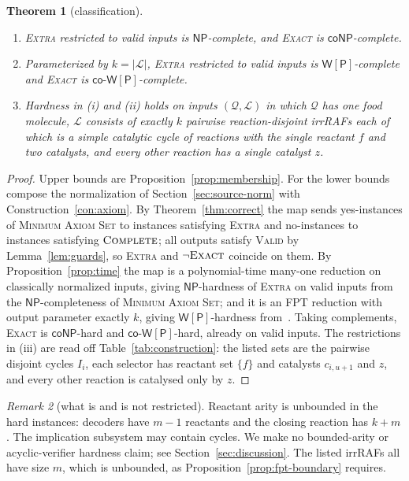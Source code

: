 \documentclass[11pt,a4paper]{article}
\theoremstyle{plain}
\newtheorem{theorem}{Theorem}[section]
\theoremstyle{definition}
\theoremstyle{remark}
\newtheorem{remark}[theorem]{Remark}
\newcommand{\Valid}{\textup{\textsc{Valid}}}
\newcommand{\Complete}{\textup{\textsc{Complete}}}
\newcommand{\Exact}{\textup{\textsc{Exact}}}
\newcommand{\Extra}{\textup{\textsc{Extra}}}
\newcommand{\MAS}{\textup{\textsc{Minimum Axiom Set}}}
\newcommand{\NP}{\mathsf{NP}}
\newcommand{\coNP}{\mathsf{coNP}}
\newcommand{\WP}{\mathsf{W[P]}}
\newcommand{\coWP}{\mathsf{co\text{-}W[P]}}
\newcommand{\cL}{\mathcal{L}}
\newcommand{\cQ}{\mathcal{Q}}
\begin{document}
\begin{theorem}[classification]\label{thm:main}
\leavevmode
\begin{enumerate}[label=\textup{(\roman*)}]
\item \Extra{} restricted to valid inputs is $\NP$-complete, and \Exact{} is $\coNP$-complete.
\item Parameterized by $k=|\cL|$, \Extra{} restricted to valid inputs is $\WP$-complete and \Exact{} is $\coWP$-complete.
\item Hardness in \textup{(i)} and \textup{(ii)} holds on inputs $(\cQ,\cL)$ in which $\cQ$ has one food molecule, $\cL$ consists of exactly $k$ pairwise reaction-disjoint irrRAFs each of which is a simple catalytic cycle of reactions with the single reactant $f$ and two catalysts, and every other reaction has a single catalyst $z$.
\end{enumerate}
\end{theorem}

\begin{proof}
Upper bounds are Proposition~\ref{prop:membership}. For the lower bounds compose the normalization of Section~\ref{sec:source-norm} with Construction~\ref{con:axiom}. By Theorem~\ref{thm:correct} the map sends yes-instances of \MAS{} to instances satisfying \Extra{} and no-instances to instances satisfying $\Complete$; all outputs satisfy \Valid{} by Lemma~\ref{lem:guards}, so \Extra{} and $\neg\Exact$ coincide on them. By Proposition~\ref{prop:time} the map is a polynomial-time many-one reduction on classically normalized inputs, giving $\NP$-hardness of \Extra{} on valid inputs from the $\NP$-completeness of \MAS; and it is an FPT reduction with output parameter exactly $k$, giving $\WP$-hardness from~\cite[Theorem~3.3]{abrahamson1995completeness}. Taking complements, \Exact{} is $\coNP$-hard and $\coWP$-hard, already on valid inputs. The restrictions in (iii) are read off Table~\ref{tab:construction}: the listed sets are the pairwise disjoint cycles $I_i$, each selector has reactant set $\{f\}$ and catalysts $c_{i,u+1}$ and $z$, and every other reaction is catalysed only by $z$.
\end{proof}

\begin{remark}[what is and is not restricted]
Reactant arity is unbounded in the hard instances: decoders have $m-1$ reactants and the closing reaction has $k+m$. The implication subsystem may contain cycles. We make no bounded-arity or acyclic-verifier hardness claim; see Section~\ref{sec:discussion}. The listed irrRAFs all have size $m$, which is unbounded, as Proposition~\ref{prop:fpt-boundary} requires.
\end{remark}
\end{document}
